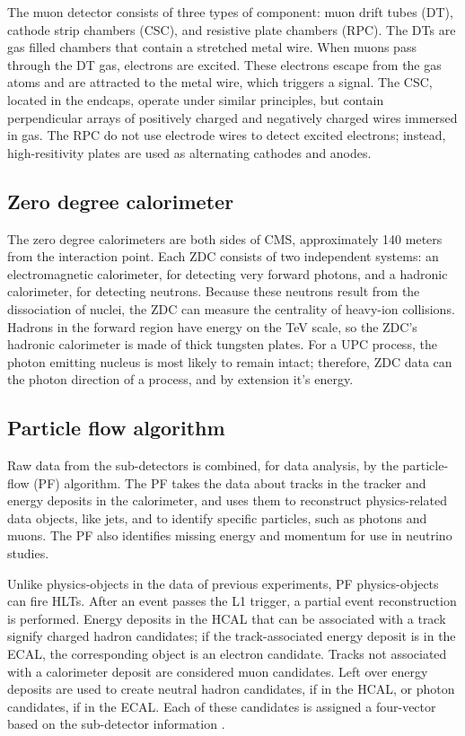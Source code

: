 The muon detector consists of three types of component: muon drift tubes (DT), cathode strip chambers (CSC), and resistive plate chambers (RPC). The DTs are gas filled chambers that contain a stretched metal wire. When muons pass through the DT gas, electrons are excited. These electrons escape from the gas atoms and are attracted to the metal wire, which triggers a signal. The CSC, located in the endcaps, operate under similar principles, but contain perpendicular arrays of positively charged and negatively charged wires immersed in gas. The RPC do not use electrode wires to detect excited electrons; instead, high-resitivity plates are used as alternating cathodes and anodes. 

\subsection{Zero degree calorimeter}

The zero degree calorimeters are both sides of CMS, approximately 140 meters from the interaction point. Each ZDC consists of two independent systems: an electromagnetic calorimeter, for detecting very forward photons, and a hadronic calorimeter, for detecting neutrons. Because these neutrons result from the dissociation of nuclei, the ZDC can measure the centrality of heavy-ion collisions. Hadrons in the forward region have energy on the TeV scale, so the ZDC's hadronic calorimeter is made of thick tungsten plates. For a UPC process, the photon emitting nucleus is most likely to remain intact; therefore, ZDC data can the photon direction of a process, and by extension it's energy. 

\subsection{Particle flow algorithm}

Raw data from the sub-detectors is combined, for data analysis, by the particle-flow (PF) algorithm. The PF takes the data about tracks in the tracker and energy deposits in the calorimeter, and uses them to reconstruct physics-related data objects, like jets, and to identify specific particles, such as photons and muons. The PF also identifies missing energy and momentum for use in neutrino studies. 

Unlike physics-objects in the data of previous experiments, PF physics-objects can fire HLTs. After an event passes the L1 trigger, a partial event reconstruction is performed. Energy deposits in the HCAL that can be associated with a track signify charged hadron candidates; if the track-associated energy deposit is in the ECAL, the corresponding object is an electron candidate. Tracks not associated with a calorimeter deposit are considered muon candidates. Left over energy deposits are used to create neutral hadron candidates, if in the HCAL, or photon candidates, if in the ECAL. Each of these candidates is assigned a four-vector based on the sub-detector information \cite{Beaudette:2014cea}. 

